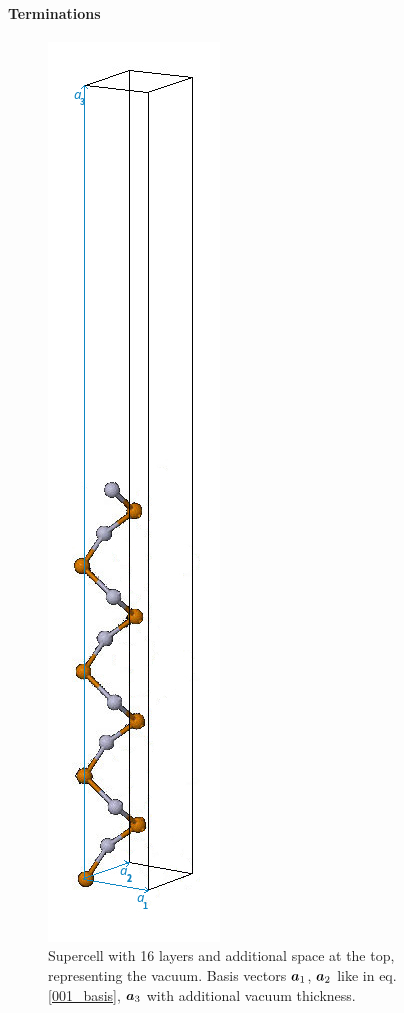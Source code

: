 	\paragraph{Terminations}
	\begin{figure}
		\centering
		\includegraphics[width=0.6\linewidth]{andere_bilder/hgte_16layer_supercell_2.jpg}
		\caption{Supercell with 16 layers and additional space at the top, representing the vacuum. Basis vectors $\boldsymbol{a}_1$, $\boldsymbol{a}_2$ like in eq. \ref{001_basis}, $\boldsymbol{a}_3$ with additional vacuum thickness.} \label{16layer_supercell}
		\vspace{-1cm}
	\end{figure} 	
